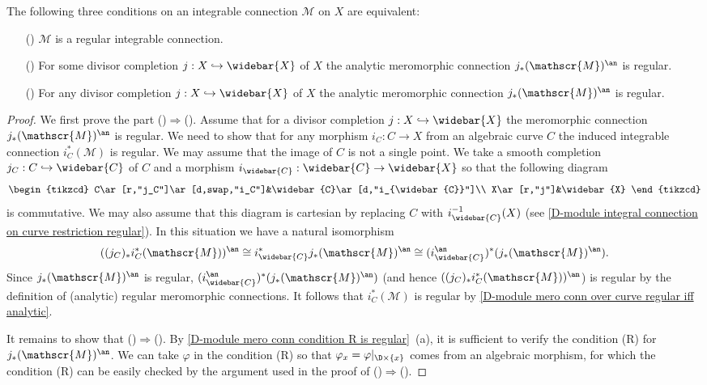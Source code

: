 \begin{proposition}\label{D-module algebraic mero conn regular iff divisorial completion}
The following three conditions on an integrable connection $\mathscr{M}$ on $X$ are equivalent:
\begin{enumerate}
    \item[(\rmnum{1})] $\mathscr{M}$ is a regular integrable connection.
    \item[(\rmnum{2})] For some divisor completion $j:X\hookrightarrow\widebar{X}$ of $X$ the analytic meromorphic connection $j_*(\mathscr{M})^{\an}$ is regular.
    \item[(\rmnum{3})] For any divisor completion $j:X\hookrightarrow\widebar{X}$ of $X$ the analytic meromorphic connection $j_*(\mathscr{M})^{\an}$ is regular.
\end{enumerate}
\end{proposition}
\begin{proof}
We first prove the part ()$\Rightarrow$(). Assume that for a divisor completion $j:X\hookrightarrow\widebar{X}$ the meromorphic connection $j_*(\mathscr{M})^{\an}$ is regular. We need to show that for any morphism $i_C:C\to X$ from an algebraic curve $C$ the induced integrable connection $i_C^*(\mathscr{M})$ is regular. We may assume that the image of $C$ is not a single point. We take a smooth completion $j_C:C\hookrightarrow\widebar{C}$ of $C$ and a morphism $i_{\widebar{C}}:\widebar{C}\to\widebar{X}$ so that the following diagram
\[\begin{tikzcd}
C\ar[r,"j_C"]\ar[d,swap,"i_C"]&\widebar{C}\ar[d,"i_{\widebar{C}}"]\\
X\ar[r,"j"]&\widebar{X}
\end{tikzcd}\]
is commutative. We may also assume that this diagram is cartesian by replacing $C$ with $i_{\widebar{C}}^{-1}(X)$ (see \cref{D-module integral connection on curve restriction regular}). In this situation we have a natural isomorphism
\[((j_C)_*i_C^*(\mathscr{M}))^{\an}\cong i_{\widebar{C}}^*j_*(\mathscr{M})^{\an}\cong (i_{\widebar{C}}^{\an})^*(j_*(\mathscr{M})^{\an}).\]
Since $j_*(\mathscr{M})^{\an}$ is regular, $(i_{\widebar{C}}^{\an})^*(j_*(\mathscr{M})^{\an})$ (and hence $((j_C)_*i_C^*(\mathscr{M}))^{\an}$) is regular by the definition of (analytic) regular meromorphic connections. It follows that $i_C^*(\mathscr{M})$ is regular by \cref{D-module mero conn over curve regular iff analytic}.\par
It remains to show that ()$\Rightarrow$(). By \cref{D-module mero conn condition R is regular}~(a), it is sufficient to verify the condition (R) for $j_*(\mathscr{M})^{\an}$. We can take $\varphi$ in the condition (R) so that $\varphi_x=\varphi|_{\D\times\{x\}}$ comes from an algebraic morphism, for which the condition (R) can be easily checked by the argument used in the proof of ()$\Rightarrow$().
\end{proof}

